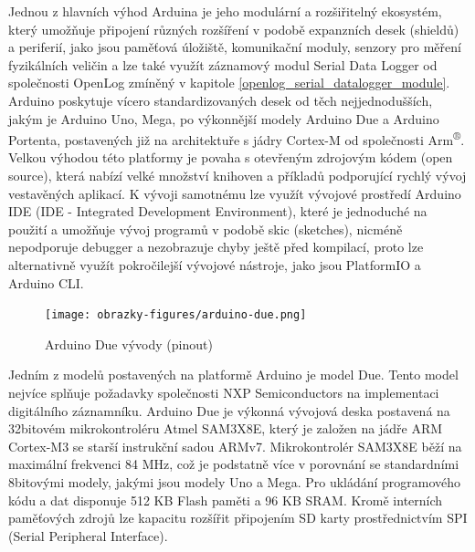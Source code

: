 Jednou z hlavních výhod Arduina je jeho modulární a rozšiřitelný ekosystém, který umožňuje připojení různých rozšíření v podobě expanzních desek (shieldů) a periferií, jako jsou paměťová úložiště, komunikační moduly, senzory pro měření fyzikálních veličin a lze také využít záznamový modul Serial Data Logger od společnosti OpenLog zmíněný v kapitole \ref{openlog_serial_datalogger_module}. Arduino poskytuje vícero standardizovaných desek od těch nejjednodušších, jakým je Arduino Uno, Mega, po výkonnější modely Arduino Due a Arduino Portenta, postavených již na architektuře s jádry Cortex-M od společnosti Arm\textsuperscript{®}. Velkou výhodou této platformy je povaha s otevřeným zdrojovým kódem (open source), která nabízí velké množství knihoven a příkladů podporující rychlý vývoj vestavěných aplikací. K vývoji samotnému lze využít vývojové prostředí Arduino IDE (IDE - Integrated Development Environment), které je jednoduché na použití a umožňuje vývoj programů v podobě skic (sketches), nicméně nepodporuje debugger a nezobrazuje chyby ještě před kompilací, proto lze alternativně využít pokročilejší vývojové nástroje, jako jsou PlatformIO a Arduino CLI.

\begin{figure}[h]
    \centering
    \texttt{[image: obrazky-figures/arduino-due.png]}
    
    \caption{Arduino Due vývody (pinout) \cite{arduino_shop_due}}
    \label{fig:arduino-due-pinout}
\end{figure}


Jedním z modelů postavených na platformě Arduino je model Due. Tento model nejvíce splňuje požadavky společnosti NXP Semiconductors na implementaci digitálního záznamníku. Arduino Due je výkonná vývojová deska postavená na 32bitovém mikrokontroléru Atmel SAM3X8E, který je založen na jádře ARM Cortex-M3 se starší instrukční sadou ARMv7. Mikrokontrolér SAM3X8E běží na maximální frekvenci 84 MHz, což je podstatně více v porovnání se  standardními 8bitovými modely, jakými jsou modely Uno a Mega. Pro ukládání programového kódu a dat disponuje 512 KB Flash paměti a 96 KB SRAM. Kromě interních paměťových zdrojů lze kapacitu rozšířit připojením SD karty prostřednictvím SPI (Serial Peripheral Interface). \cite{arduino_shop_due, arduino_shop_due}

